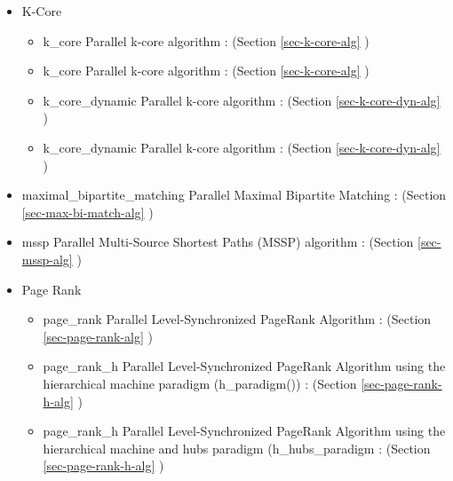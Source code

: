 \begin{itemize}
\item
K-Core 
\begin{itemize}
\item
k\_core 
\newline
Parallel k-core algorithm
 : (Section \ref{sec-k-core-alg} )
\item
k\_core 
\newline
Parallel k-core algorithm
 : (Section \ref{sec-k-core-alg} )
\item
k\_core\_dynamic 
\newline
Parallel k-core algorithm
 : (Section \ref{sec-k-core-dyn-alg} )
\item
k\_core\_dynamic 
\newline
Parallel k-core algorithm
 : (Section \ref{sec-k-core-dyn-alg} )
\end{itemize}

\item
maximal\_bipartite\_matching 
\newline
Parallel Maximal Bipartite Matching 
 : (Section \ref{sec-max-bi-match-alg} )
\item
mssp 
\newline
Parallel Multi-Source Shortest Paths (MSSP) algorithm
 : (Section \ref{sec-mssp-alg} )

\item
Page Rank
\begin{itemize}
\item
page\_rank 
\newline
Parallel Level-Synchronized PageRank Algorithm
 : (Section \ref{sec-page-rank-alg} )
\item
page\_rank\_h 
\newline
Parallel Level-Synchronized PageRank Algorithm using the hierarchical machine paradigm (h\_paradigm())
 : (Section \ref{sec-page-rank-h-alg} )
\item
page\_rank\_h 
\newline
Parallel Level-Synchronized PageRank Algorithm using the hierarchical machine and hubs paradigm (h\_hubs\_paradigm
 : (Section \ref{sec-page-rank-h-alg} )
\end{itemize}


\end{itemize}

